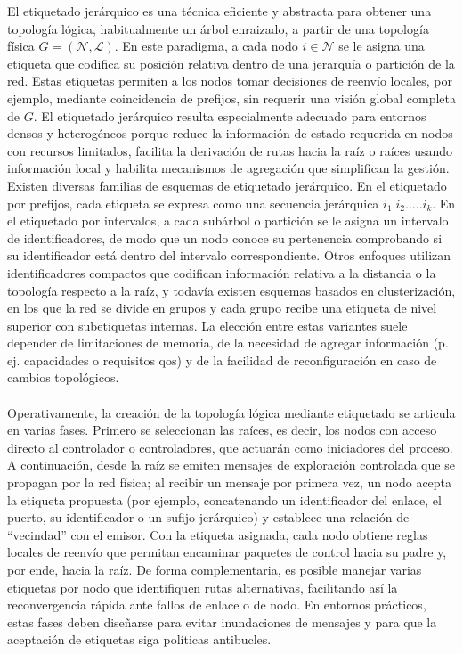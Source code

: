 El etiquetado jerárquico es una técnica eficiente y abstracta para obtener una topología lógica, habitualmente un árbol enraizado, a partir de una topología física \(G=(\mathcal{N},\mathcal{L})\). En este paradigma, a cada nodo \(i\in\mathcal{N}\) se le asigna una etiqueta que codifica su posición relativa dentro de una jerarquía o partición de la red. Estas etiquetas permiten a los nodos tomar decisiones de reenvío locales, por ejemplo, mediante coincidencia de prefijos, sin requerir una visión global completa de \(G\). El etiquetado jerárquico resulta especialmente adecuado para entornos densos y heterogéneos porque reduce la información de estado requerida en nodos con recursos limitados, facilita la derivación de rutas hacia la raíz o raíces usando información local y habilita mecanismos de agregación que simplifican la gestión. Existen diversas familias de esquemas de etiquetado jerárquico. En el etiquetado por prefijos, cada etiqueta se expresa como una secuencia jerárquica \(i_1.i_2. \dots .i_k\). En el etiquetado por intervalos, a cada subárbol o partición se le asigna un intervalo de identificadores, de modo que un nodo conoce su pertenencia comprobando si su identificador está dentro del intervalo correspondiente. Otros enfoques utilizan identificadores compactos que codifican información relativa a la distancia o la topología respecto a la raíz, y todavía existen esquemas basados en clusterización, en los que la red se divide en grupos y cada grupo recibe una etiqueta de nivel superior con subetiquetas internas. La elección entre estas variantes suele depender de limitaciones de memoria, de la necesidad de agregar información (p. ej. capacidades o requisitos \gls{qos}) y de la facilidad de reconfiguración en caso de cambios topológicos.\\
\\
Operativamente, la creación de la topología lógica mediante etiquetado se articula en varias fases. Primero se seleccionan las raíces, es decir, los nodos con acceso directo al controlador o controladores, que actuarán como iniciadores del proceso. A continuación, desde la raíz se emiten mensajes de exploración controlada que se propagan por la red física; al recibir un mensaje por primera vez, un nodo acepta la etiqueta propuesta (por ejemplo, concatenando un identificador del enlace, el puerto, su identificador o un sufijo jerárquico) y establece una relación de ``vecindad'' con el emisor. Con la etiqueta asignada, cada nodo obtiene reglas locales de reenvío que permitan encaminar paquetes de control hacia su padre y, por ende, hacia la raíz. De forma complementaria, es posible manejar varias etiquetas por nodo que identifiquen rutas alternativas, facilitando así la reconvergencia rápida ante fallos de enlace o de nodo. En entornos prácticos, estas fases deben diseñarse para evitar inundaciones de mensajes y para que la aceptación de etiquetas siga políticas antibucles.\\

